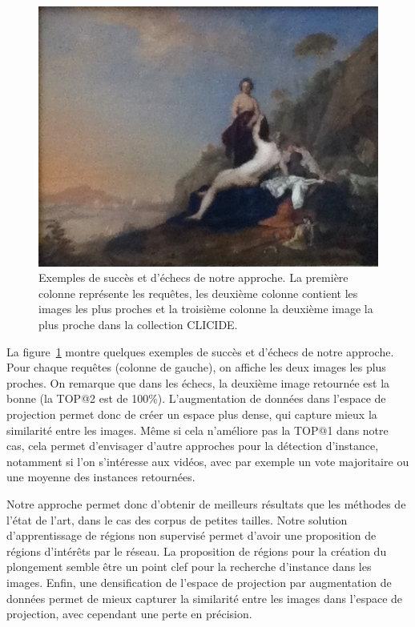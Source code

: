 \begin{figure}
\begin{minipage}[c]{.33\linewidth}
  \end{minipage}
  \begin{minipage}[c]{.32\linewidth}
    \centering
    \includegraphics[width=\textwidth]{figures/5B-0.JPG}
  \end{minipage}
  
\caption{Exemples de succès et d'échecs de notre approche. La première colonne représente les requêtes, les deuxième colonne contient les images les plus proches et la troisième colonne la deuxième image la plus proche dans la collection CLICIDE.}
\label{fig:failing}
\end{figure}

La figure~\ref{fig:failing} montre quelques exemples de succès et d'échecs de notre approche.
Pour chaque requêtes (colonne de gauche), on affiche les deux images les plus proches.
On remarque que dans les échecs, la deuxième image retournée est la bonne (la TOP@2 est de 100\%).
L'augmentation de données dans l'espace de projection permet donc de créer un espace plus dense, qui capture mieux la similarité entre les images.
Même si cela n'améliore pas la TOP@1 dans notre cas, cela permet d'envisager d'autre approches pour la détection d'instance, notamment si l'on s'intéresse aux vidéos, avec par exemple un vote majoritaire ou une moyenne des instances retournées.

Notre approche permet donc d'obtenir de meilleurs résultats que les méthodes de l'état de l'art, dans le cas des corpus de petites tailles.
Notre solution d'apprentissage de régions non supervisé permet d'avoir une proposition de régions d'intérêts par le réseau.
La proposition de régions pour la création du plongement semble être un point clef pour la recherche d'instance dans les images.
Enfin, une densification de l'espace de projection par augmentation de données permet de mieux capturer la similarité entre les images dans l'espace de projection, avec cependant une perte en précision.




